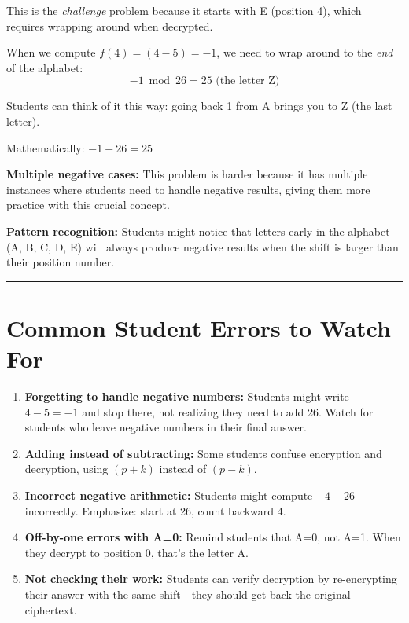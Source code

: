 \documentclass[12pt]{article}
\begin{document}
\begin{tcolorbox}[colback=yellow!10!white,colframe=orange!50!black,title=\textbf{Teaching Note}]
This is the \textit{challenge} problem because it starts with E (position 4), which requires wrapping around when decrypted.

When we compute $f(4) = (4 - 5) = -1$, we need to wrap around to the \emph{end} of the alphabet:
$$-1 \bmod 26 = 25 \text{ (the letter Z)}$$

Students can think of it this way: going back 1 from A brings you to Z (the last letter).

Mathematically: $-1 + 26 = 25$

\textbf{Multiple negative cases:} This problem is harder because it has multiple instances where students need to handle negative results, giving them more practice with this crucial concept.

\textbf{Pattern recognition:} Students might notice that letters early in the alphabet (A, B, C, D, E) will always produce negative results when the shift is larger than their position number.
\end{tcolorbox}

\vspace{0.8cm}
\hrule
\vspace{0.8cm}

\section*{Common Student Errors to Watch For}

\begin{enumerate}[leftmargin=*]
\item \textbf{Forgetting to handle negative numbers:} Students might write $4 - 5 = -1$ and stop there, not realizing they need to add 26. Watch for students who leave negative numbers in their final answer.

\item \textbf{Adding instead of subtracting:} Some students confuse encryption and decryption, using $(p + k)$ instead of $(p - k)$.

\item \textbf{Incorrect negative arithmetic:} Students might compute $-4 + 26$ incorrectly. Emphasize: start at 26, count backward 4.

\item \textbf{Off-by-one errors with A=0:} Remind students that A=0, not A=1. When they decrypt to position 0, that's the letter A.

\item \textbf{Not checking their work:} Students can verify decryption by re-encrypting their answer with the same shift—they should get back the original ciphertext.
\end{enumerate}
\end{document}
